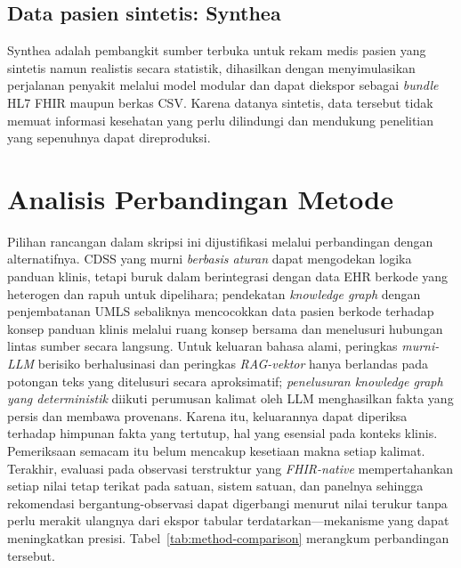 \subsection{Data pasien sintetis: Synthea}
Synthea \cite{synthea} adalah pembangkit sumber terbuka untuk rekam medis pasien yang sintetis
namun realistis secara statistik, dihasilkan dengan menyimulasikan perjalanan penyakit melalui
model modular dan dapat diekspor sebagai \emph{bundle} HL7 FHIR maupun berkas CSV. Karena
datanya sintetis, data tersebut tidak memuat informasi kesehatan yang perlu dilindungi dan mendukung
penelitian yang sepenuhnya dapat direproduksi.

\section{Analisis Perbandingan Metode}

Pilihan rancangan dalam skripsi ini dijustifikasi melalui perbandingan dengan alternatifnya.
CDSS yang murni \emph{berbasis aturan} dapat mengodekan logika panduan klinis, tetapi buruk dalam
berintegrasi dengan data EHR berkode yang heterogen dan rapuh untuk dipelihara; pendekatan
\emph{knowledge graph} dengan penjembatanan UMLS sebaliknya mencocokkan data pasien berkode
terhadap konsep panduan klinis melalui ruang konsep bersama dan menelusuri hubungan lintas sumber
secara langsung. Untuk keluaran bahasa alami, peringkas \emph{murni-LLM} berisiko
berhalusinasi dan peringkas \emph{RAG-vektor} hanya berlandas pada potongan teks yang
ditelusuri secara aproksimatif; \emph{penelusuran knowledge graph yang deterministik} diikuti
perumusan kalimat oleh LLM menghasilkan fakta yang persis dan membawa provenans. Karena itu,
keluarannya dapat diperiksa terhadap himpunan fakta yang tertutup, hal yang esensial pada
konteks klinis. Pemeriksaan semacam itu belum mencakup kesetiaan makna setiap kalimat.
Terakhir, evaluasi pada observasi terstruktur yang \emph{FHIR-native}
mempertahankan setiap nilai tetap terikat pada satuan, sistem satuan, dan panelnya sehingga
rekomendasi bergantung-observasi dapat digerbangi menurut nilai terukur tanpa perlu merakit
ulangnya dari ekspor tabular terdatarkan---mekanisme yang dapat meningkatkan presisi.
Tabel~\ref{tab:method-comparison} merangkum perbandingan tersebut.

